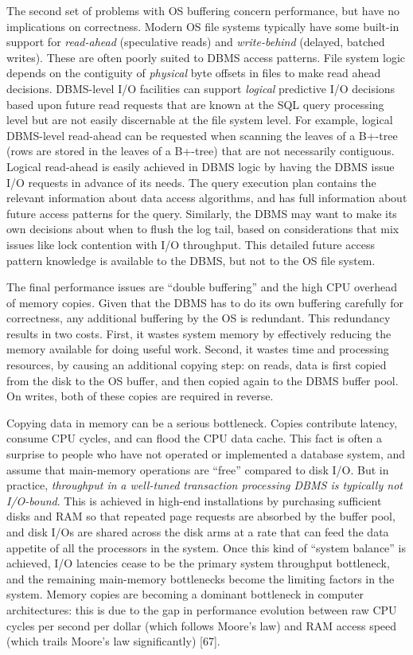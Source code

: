 \documentclass[b5paper,11pt,twoside,openright]{book}
\begin{document}
The second set of problems with OS buffering concern performance, but
have no implications on correctness. Modern OS file systems typically
have some built-in support for \emph{read-ahead} (speculative reads) and
\emph{write-behind} (delayed, batched writes). These are often poorly
suited to DBMS access patterns. File system logic depends on the
contiguity of \emph{physical} byte offsets in files to make read ahead
decisions. DBMS-level I/O facilities can support \emph{logical}
predictive I/O decisions based upon future read requests that are known
at the SQL query processing level but are not easily discernable at the
file system level. For example, logical DBMS-level read-ahead can be
requested when scanning the leaves of a B+-tree (rows are stored in the
leaves of a B+-tree) that are not necessarily contiguous. Logical
read-ahead is easily achieved in DBMS logic by having the DBMS issue I/O
requests in advance of its needs. The query execution plan contains the
relevant information about data access algorithms, and has full
information about future access patterns for the query. Similarly, the
DBMS may want to make its own decisions about when to flush the log
tail, based on considerations that mix issues like lock contention with
I/O throughput. This detailed future access pattern knowledge is
available to the DBMS, but not to the OS file system.

The final performance issues are ``double buffering'' and the high CPU
overhead of memory copies\emph{.} Given that the DBMS has to do its own
buffering carefully for correctness, any additional buffering by the OS
is redundant. This redundancy results in two costs. First, it wastes
system memory by effectively reducing the memory available for doing
useful work. Second, it wastes time and processing resources, by causing
an additional copying step: on reads, data is first copied from the disk
to the OS buffer, and then copied again to the DBMS buffer pool. On
writes, both of these copies are required in reverse.

Copying data in memory can be a serious bottleneck. Copies contribute
latency, consume CPU cycles, and can flood the CPU data cache. This fact
is often a surprise to people who have not operated or implemented a
database system, and assume that main-memory operations are ``free''
compared to disk I/O. But in practice, \emph{throughput in} \emph{a
well-tuned transaction processing DBMS is typically not I/O-bound}. This
is achieved in high-end installations by purchasing sufficient disks and
RAM so that repeated page requests are absorbed by the buffer pool, and
disk I/Os are shared across the disk arms at a rate that can feed the
data appetite of all the processors in the system. Once this kind of
``system balance'' is achieved, I/O latencies cease to be the primary
system throughput bottleneck, and the remaining main-memory bottlenecks
become the limiting factors in the system. Memory copies are becoming a
dominant bottleneck in computer architectures: this is due to the gap in
performance evolution between raw CPU cycles per second per dollar
(which follows Moore's law) and RAM access speed (which trails Moore's
law significantly) {[}67{]}.
\end{document}
